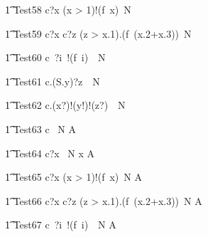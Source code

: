 \begin{circusaction}
   \t1 Test58 \circdef c?x \prefixcolon (x > 1)!(f~x)\circat~N \then \Skip
\end{circusaction}

\begin{circusaction}
   \t1 Test59 \circdef c?x \then c?z \prefixcolon (z > x.1).(f~(x.2+x.3))\circat~N \then \Skip
\end{circusaction}

\begin{circusaction}
   \t1 Test60 \circdef c~?i~!(f~i)~\circat~N \then \Skip
\end{circusaction}

\begin{circusaction}
   \t1 Test61 \circdef c.(S.y)?z~\circat~N \then \Skip
\end{circusaction}

\begin{circusaction}
   \t1 Test62 \circdef c.(x?)!(y!)!(z?)~\circat~N \then \Skip
\end{circusaction}



\begin{circusaction}
   \t1 Test63 \circdef c \circat~N  \then {} \rcirctime A \\
\end{circusaction}

\begin{circusaction}
   \t1 Test64 \circdef c?x \circat~N  \then \lcirctime x \rcirctime A \\
\end{circusaction}

\begin{circusaction}
   \t1 Test65 \circdef c?x \prefixcolon (x > 1)!(f~x)\circat~N \then {} \rcirctime A \\
\end{circusaction}

\begin{circusaction}
   \t1 Test66 \circdef c?x \then c?z \prefixcolon (z > x.1).(f~(x.2+x.3))\circat~N \then {} \rcirctime A \\
\end{circusaction}

\begin{circusaction}
   \t1 Test67 \circdef c~?i~!(f~i)~\circat~N \then {} \rcirctime A \\
\end{circusaction}

